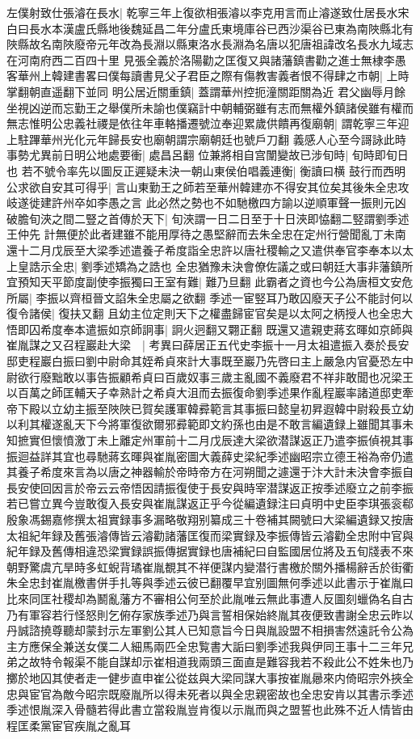 左僕射致仕張濬在長水|{
	乾寧三年上復欲相張濬以李克用言而止濬遂致仕居長水宋白曰長水本漢盧氏縣地後魏延昌二年分盧氏東境庫谷已西沙渠谷已東為南陜縣北有陜縣故名南陜廢帝元年改為長淵以縣東洛水長淵為名唐以犯唐祖諱改名長水九域志在河南府西二百四十里}
見張全義於洛陽勸之匡復又與諸藩鎮書勸之進士無棣李愚客華州上韓建書畧曰僕每讀書見父子君臣之際有傷教害義者恨不得肆之市朝|{
	上時掌翻朝直遥翻下並同}
明公居近關重鎮|{
	蓋謂華州控扼潼關距關為近}
君父幽辱月餘坐視凶逆而忘勤王之舉僕所未諭也僕竊計中朝輔弼雖有志而無權外鎮諸侯雖有權而無志惟明公忠義社禝是依往年車輅播遷號泣奉迎累歲供饋再復廟朝|{
	謂乾寧三年迎上駐蹕華州光化元年歸長安也廟朝謂宗廟朝廷也號戶刀翻}
義感人心至今謌詠此時事勢尤異前日明公地處要衝|{
	處昌呂翻}
位兼將相自宫闈變故已涉旬時|{
	旬時即旬日也}
若不號令率先以圖反正遲疑未決一朝山東侯伯唱義連衡|{
	衡讀曰横}
鼓行而西明公求欲自安其可得乎|{
	言山東勤王之師若至華州韓建亦不得安其位矣其後朱全忠攻岐遂徙建許州卒如李愚之言}
此必然之勢也不如馳檄四方諭以逆順軍聲一振則元凶破膽旬浹之間二豎之首傳於天下|{
	旬浹謂一日二日至于十日浹即恊翻二竪謂劉季述王仲先}
計無便於此者建雖不能用厚待之愚堅辭而去朱全忠在定州行營聞亂丁未南還十二月戊辰至大梁季述遣養子希度詣全忠許以唐社稷輸之又遣供奉官李奉本以太上皇誥示全忠|{
	劉季述矯為之誥也}
全忠猶豫未決會僚佐議之或曰朝廷大事非藩鎮所宜預知天平節度副使李振獨曰王室有難|{
	難乃旦翻}
此霸者之資也今公為唐桓文安危所屬|{
	李振以齊桓晉文諂朱全忠屬之欲翻}
季述一宦竪耳乃敢囚廢天子公不能討何以復令諸侯|{
	復扶又翻}
且幼主位定則天下之權盡歸宦官矣是以太阿之柄授人也全忠大悟即囚希度奉本遣振如京師詗事|{
	詗火迥翻又翾正翻}
既還又遣親吏蔣玄暉如京師與崔胤謀之又召程巖赴大梁　|{
	考異曰薛居正五代史李振十一月太祖遣振入奏於長安邸吏程巖白振曰劉中尉命其姪希貞來計大事既至巖乃先啓曰主上嚴急内官憂恐左中尉欲行廢黜敢以事告振顧希貞曰百歲奴事三歲主亂國不義廢君不祥非敢聞也况梁王以百萬之師匡輔天子幸熟計之希貞大沮而去振復命劉季述果作亂程巖率諸道邸吏牽帝下殿以立幼主振至陜陜已賀矣護軍韓彛範言其事振曰懿皇初昇遐韓中尉殺長立幼以利其權遂亂天下今將軍復欲爾邪彛範即文約孫也由是不敢言編遺録上雖聞其事未知摭實但懷憤激丁未上離定州軍前十二月戊辰達大梁欲潜謀返正乃遣李振偵視其事振迴益詳其宜也尋馳蔣玄暉與崔胤密圖大義薛史梁紀季述幽昭宗立德王裕為帝仍遣其養子希度來言為以唐之神器輸於帝時帝方在河朔聞之遽還于汴大計未決會李振自長安使回因言於帝云云帝悟因請振復使于長安與時宰潜謀返正按季述廢立之前李振若已嘗立異今豈敢復入長安與崔胤謀返正乎今從編遺録注曰貞明中史臣李琪張衮郗殷象馮錫嘉修撰太祖實録事多漏略敬翔别纂成三十卷補其闕號曰大梁編遺録又按唐太祖紀年録及舊張濬傳皆云濬勸諸藩匡復而梁實録及李振傳皆云濬勸全忠附中官與紀年録及舊傳相違恐梁實録誤振傳据實録也唐補紀曰自監國居位將及五旬牋表不來朝野驚虞亢旱時多虹蜺背璚崔胤覩其不祥便謀内變潜行書檄於關外播楊辭舌於街衢朱全忠封崔胤檄書併手扎等與季述云彼已翻覆早宜别圖無何季述以此書示于崔胤曰比來同匡社稷却為鬭亂藩方不審相公何至於此胤唯云無此事遭人反圖刻蠟偽名自古乃有軍容若行怪怒則乞俯存家族季述乃與言誓相保始終胤其夜便致書謝全忠云昨以丹誠諮撓尊聽却蒙封示左軍劉公其人已知意旨今日與胤設盟不相損害然遠託令公為主方應保全兼送女僕二人細馬兩匹全忠覧書大詬曰劉季述我與伊同王事十二三年兄弟之故特令報渠不能自謀却示崔相道我兩頭三面直是難容我若不殺此公不姓朱也乃擲於地囚其使者走一健步直申崔公從兹與大梁同謀大事按崔胤曏來内倚昭宗外挾全忠與宦官為敵今昭宗既廢胤所以得未死者以與全忠親密故也全忠安肯以其書示季述季述恨胤深入骨髓若得此書立當殺胤豈肯復以示胤而與之盟誓也此殊不近人情皆由程匡柔黨宦官疾胤之亂耳}
